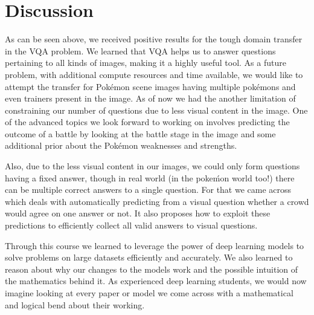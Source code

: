 \documentclass[journal, a4paper]{IEEEtran}
\begin{document}
\section{Discussion}
    As can be seen above, we received positive results for the tough domain transfer in the VQA problem. We learned that VQA helps us to answer questions pertaining to all kinds of images, making it a highly useful tool. As a future problem, with additional compute resources and time available, we would like to attempt the transfer for Pok\'emon scene images having multiple pok\'emons and even trainers present in the image. As of now we had the another limitation of constraining our number of questions due to less visual content in the image. One of the advanced topics we look forward to working on involves predicting the outcome of a battle by looking at the battle stage in the image and some additional prior about the Pok\'emon weaknesses and strengths.
    
Also, due to the less visual content in our images, we could only form questions having a fixed answer, though in real world (in the poke\'mon world too!) there can be multiple correct answers to a single question. For that we came across \cite{GURARI} which deals with automatically predicting from a visual question whether a
crowd would agree on one answer or not. It also proposes how to
exploit these predictions to efficiently collect all valid answers to visual questions. 

Through this course we learned to leverage the power of deep learning models to solve problems on large datasets efficiently and accurately. We also learned to reason about why our changes to the models work and the possible intuition of the mathematics behind it. As experienced deep learning students, we would now imagine looking at every paper or model we come across with a mathematical and logical bend about their working.
\end{document}

